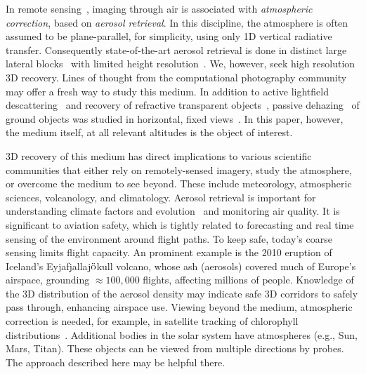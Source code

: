 \documentclass[10pt,twocolumn,letterpaper]{article}
\begin{document}
In remote sensing~\cite{diner,Seidel}, imaging through air is associated with {\em atmospheric correction}, based on {\em aerosol retrieval}. In this discipline, the atmosphere is often assumed to be plane-parallel, for simplicity, using only 1D vertical radiative transfer. Consequently state-of-the-art aerosol retrieval is done in distinct large lateral blocks~\cite{matronchik} with limited height resolution~\cite{kalashnikova}. We, however, seek high resolution 3D recovery. Lines of thought from the computational photography community may offer a fresh way to study this medium. In addition to active lightfield descattering~\cite{fuchs,kim,levoy, Marschner} and recovery of refractive transparent objects~\cite{ihrke, Saito}, passive dehazing~\cite{Joshi2, Milanfar}
 of ground objects was studied in horizontal, fixed views~\cite{fattal,he,kopf,kratz,narasimhan2,oakley,Hschechner2,tan}. In this paper, however, the medium itself, at all relevant altitudes is the object of interest.



3D recovery of this medium has direct implications to various scientific communities that either rely on remotely-sensed imagery, study the atmosphere, or overcome the medium to see beyond. These include meteorology, atmospheric sciences, volcanology, and climatology.
Aerosol retrieval %
is important for %
understanding climate factors and evolution~\cite{chud,dayan,kalashnikova} and
monitoring air quality. It is significant to aviation safety, which is tightly related to forecasting and real time sensing of the environment around flight
paths. To keep safe, today's coarse sensing limits flight capacity. An prominent example is the 2010 eruption of Iceland's
Eyjafjallaj$\ddot {\rm o}$kull volcano, whose ash (aerosols) covered much of Europe's airspace, grounding $\approx 100,000$ flights, affecting millions of people. Knowledge of the 3D distribution of the aerosol density may indicate safe 3D corridors to safely pass through, enhancing airspace use. Viewing beyond the medium, atmospheric correction is needed, for example, in satellite tracking of chlorophyll distributions~\cite{chang,johnsen,levy,moses}. Additional bodies in the solar system have atmospheres (e.g., Sun, Mars, Titan). These objects can be viewed from multiple directions by probes.
The approach described here may be helpful there.
\end{document}
